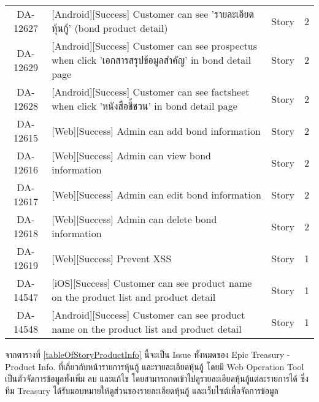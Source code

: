 \begin{tabularx}{\linewidth}{|c|X|c|c|}
    DA-12627 &[Android][Success] Customer can see 'รายละเอียดหุ้นกู้' (bond product detail) &Story &2\\
    DA-12629 &[Android][Success] Customer can see prospectus when click 'เอกสารสรุปข้อมูลสำคัญ' in bond detail page &Story &2\\
    DA-12628 &[Android][Success] Customer can see factsheet when click 'หนังสือชี้ชวน' in bond detail page &Story &2\\
    DA-12615 &[Web][Success] Admin can add bond information &Story &2\\
    DA-12616 &[Web][Success] Admin can view bond information &Story &2\\
    DA-12617 &[Web][Success] Admin can edit bond information &Story &2\\
    DA-12618 &[Web][Success] Admin can delete bond information &Story &2\\
    DA-12619 &[Web][Success] Prevent XSS &Story &1\\
    DA-14547 &[iOS][Success] Customer can see product name on the product list and product detail &Story &1\\
    DA-14548 &[Android][Success] Customer can see product name on the product list and product detail &Story &1\\
	\hline
\end{tabularx}

จากตารางที่ \ref{tableOfStoryProductInfo}  นี้จะเป็น Issue ทั้งหมดของ Epic Treasury - Product Info. ที่เกี่ยวกับหน้ารายการหุ้นกู้ และรายละเอียดหุ้นกู้ โดยมี Web Operation Tool เป็นตัวจัดการข้อมูลทั้งเพิ่ม
ลบ และแก้ไข โดยสามารถกดเข้าไปดูรายละเอียดหุ้นกู้แต่ละรายการได้ ซึ่งทีม Treasury ได้รับมอบหมายให้ดูส่วนของรายละเอียดหุ้นกู้ และเว็บไซต์เพื่อจัดการข้อมูล

